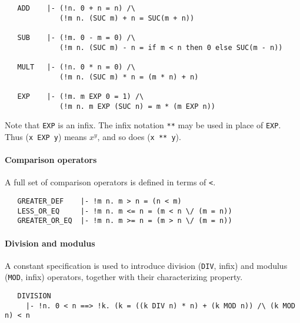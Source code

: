\begin{hol}
{\small
\begin{verbatim}
   ADD    |- (!n. 0 + n = n) /\
             (!m n. (SUC m) + n = SUC(m + n))

   SUB    |- (!m. 0 - m = 0) /\
             (!m n. (SUC m) - n = if m < n then 0 else SUC(m - n))

   MULT   |- (!n. 0 * n = 0) /\
             (!m n. (SUC m) * n = (m * n) + n)

   EXP    |- (!m. m EXP 0 = 1) /\
             (!m n. m EXP (SUC n) = m * (m EXP n))
\end{verbatim}
}
\end{hol}
%
Note that {\small\verb+EXP+} is an infix. The infix notation
{\verb+**+} may be used in place of {\small\verb+EXP+}. Thus
({\small\verb+x EXP y+}) means $x^y$, and so does ({\verb+x ** y+}).

\paragraph{Comparison operators}

A full set of comparison operators is defined in terms of \verb+<+.

\begin{hol}
{\small
\begin{verbatim}
   GREATER_DEF    |- !m n. m > n = (n < m)
   LESS_OR_EQ     |- !m n. m <= n = (m < n \/ (m = n))
   GREATER_OR_EQ  |- !m n. m >= n = (m > n \/ (m = n))
\end{verbatim}
}
\end{hol}

\paragraph{Division and modulus}

A constant specification is used to introduce division ({\small\verb+DIV+}, infix) and
modulus ({\small\verb+MOD+}, infix) operators, together with their
characterizing property.
\begin{hol}
\index{MOD@\ml{MOD}}
\index{DIV@\ml{DIV}}
{\small
\begin{verbatim}
   DIVISION
     |- !n. 0 < n ==> !k. (k = ((k DIV n) * n) + (k MOD n)) /\ (k MOD n) < n
\end{verbatim}
}
\end{hol}

